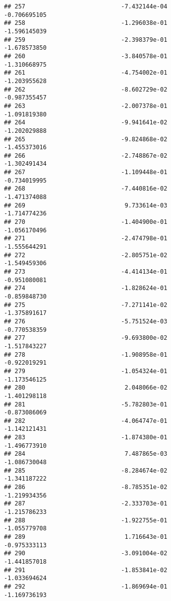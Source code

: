 \documentclass[
]{article}
\begin{document}
\begin{verbatim}
## 257                           -7.432144e-04               -0.706695105
## 258                           -1.296038e-01               -1.596145039
## 259                           -2.398379e-01               -1.678573850
## 260                           -3.840578e-01               -1.310668975
## 261                           -4.754002e-01               -1.203955628
## 262                           -8.602729e-02               -0.987355457
## 263                           -2.007378e-01               -1.091819380
## 264                           -9.941641e-02               -1.202029888
## 265                           -9.824868e-02               -1.455373016
## 266                           -2.748867e-02               -1.302491434
## 267                           -1.109448e-01               -0.734019995
## 268                           -7.440816e-02               -1.471374088
## 269                            9.733614e-03               -1.714774236
## 270                           -1.404900e-01               -1.056170496
## 271                           -2.474798e-01               -1.555644291
## 272                           -2.805751e-02               -1.549459306
## 273                           -4.414134e-01               -0.951080081
## 274                           -1.828624e-01               -0.859848730
## 275                           -7.271141e-02               -1.375891617
## 276                           -5.751524e-03               -0.770538359
## 277                           -9.693800e-02               -1.517843227
## 278                           -1.908958e-01               -0.922019291
## 279                           -1.054324e-01               -1.173546125
## 280                            2.048066e-02               -1.401298118
## 281                           -5.782803e-01               -0.873086069
## 282                           -4.064747e-01               -1.142121431
## 283                           -1.874380e-01               -1.496773910
## 284                            7.487865e-03               -1.086730048
## 285                           -8.284674e-02               -1.341187222
## 286                           -8.785351e-02               -1.219934356
## 287                           -2.333703e-01               -1.215786233
## 288                           -1.922755e-01               -1.055779708
## 289                            1.716643e-01               -0.975333113
## 290                           -3.091004e-02               -1.441857018
## 291                           -1.853841e-02               -1.033694624
## 292                           -1.869694e-01               -1.169736193

\end{verbatim}
\end{document}
